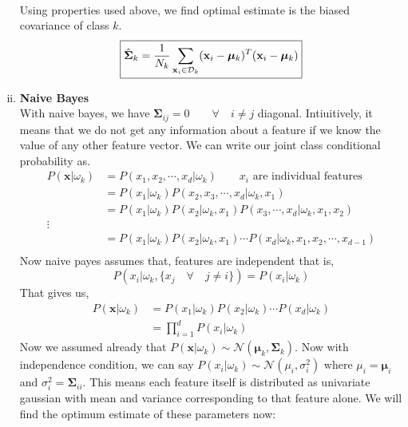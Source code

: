 \documentclass[11pt,paper=a4,answers]{exam}
\renewcommand{\vec}[1]{\mathbf{#1}}
\begin{document}
\begin{questions}
\begin{enumerate}[i.]
\begin{align*}
        \end{align*}
        Using properties used above,  we find optimal estimate is the biased covariance of class $k$.
        \begin{align}
            \boxed{\hat{\bm{\Sigma}}_k = {1 \over N_k} \sum_{\vec{x}_i \in \mathcal{D}_k} (\vec{x}_i - \bm{\mu}_k)^T (\vec{x}_i - \bm{\mu}_k)}
        \end{align}
        \item \textbf{Naive Bayes}\\
            With naive bayes, we have $\bm{\Sigma}_{ij} = 0 \qquad \forall \quad i \neq j$ diagonal. Intiuitively, it means that we do not get any information about a feature if we know the value of any other feature vector. We can write our joint class conditional probability as.
            \begin{align*}
                P(\vec{x}| \omega_k) &= P(x_1, x_2, \cdots, x_d | \omega_k) \qquad \text{$x_i$ are individual features}\\
                &= P(x_1| \omega_k) P(x_2, x_3, \cdots, x_d| \omega_k, x_1)\\
                &= P(x_1| \omega_k) P(x_2| \omega_k, x_1) P(x_3, \cdots, x_d| \omega_k, x_1, x_2)\\
                \vdots\\
                &= P(x_1| \omega_k) P(x_2| \omega_k, x_1)  \cdots P(x_d| \omega_k, x_1, x_2, \cdots, x_{d-1})\\
            \end{align*}
            Now naive payes assumes that, features are independent that is,
            $$P(x_i|\omega_k, \{x_j \quad \forall \quad j \neq i\}) = P(x_i| \omega_k)$$
            That gives us, 
            \begin{align*}
            P(\vec{x} \vert \omega_k) &= P(x_1 \vert \omega_k) P(x_2 \vert \omega_k) \cdots P(x_d \vert \omega_k)\\    
            &= \prod _{i=1}^d P(x_i \vert \omega_k)
            \end{align*}
            Now we assumed already that $P(\vec{x}| \omega_k) \sim \mathcal{N}(\bm{\mu}_k , \bm{\Sigma}_k)$. Now with independence condition, we can say $P(x_i| \omega_k) \sim \mathcal{N}(\mu_i , \sigma_i^2)$ where $\mu_i = \bm{\mu}_i$ and $\sigma_i^2 = \bm{\Sigma}_{ii}$. This means each feature itself is distributed as univariate gaussian with mean and variance corresponding to that feature alone. We will find the optimum estimate of these parameters now:\\

\end{enumerate}
\end{questions}
\end{document}
